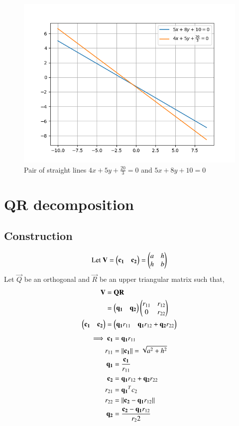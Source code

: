 \documentclass[journal,12pt,twocolumn]{IEEEtran}
\begin{document}
\begin{figure}[h]
	\centering
	\includegraphics[width=\columnwidth]{fig/figure_2.png}
	\caption{Pair of straight lines $4x + 5y + \frac{20}{3} = 0$ and $5x + 8y + 10 = 0$}
	\label{fig:figure2}
\end{figure}
\section{QR decomposition}
\subsection{Construction}

\begin{equation}\label{eq28}
	\text{Let } \mathbf{V} = \begin{pmatrix}\mathbf{c_1} & \mathbf{c_2}\end{pmatrix} = \begin{pmatrix}a & h\\h & b\end{pmatrix}
\end{equation}
Let $\vec{Q}$ be an orthogonal and $\vec{R}$ be an upper triangular matrix such that, 
\begin{align}\label{eq29}
	\mathbf{V} &= \mathbf{Q}\mathbf{R}\\
	&= \begin{pmatrix}\mathbf{q_1} & \mathbf{q_2}\end{pmatrix}\begin{pmatrix}r_{11} & r_{12}\\0 & r_{22}\end{pmatrix}\\
	\begin{pmatrix}\mathbf{c_1} & \mathbf{c_2}\end{pmatrix} &= \begin{pmatrix}\mathbf{q_1}r_{11} & \mathbf{q_1}r_{12} + \mathbf{q_2}r_{22}\end{pmatrix}
\end{align}
\begin{align}
	\label{eq32}\implies\mathbf{c_1} &= \mathbf{q_1}r_{11}\\
	\label{eq33}r_{11} &= \left\lVert\mathbf{c_1}\right\rVert = \sqrt{a^2 + h^2}\\
	\label{eq34}\mathbf{q_1} &= \frac{\mathbf{c_1}}{r_{11}}\\
	\label{eq35}\mathbf{c_2} &= \mathbf{q_1}r_{12} + \mathbf{q_2}r_{22}\\
	\label{eq36}r_{21} &= \mathbf{q_1}^Tc_2\\
	\label{eq37}r_{22} &= \left\lVert\mathbf{c_2} - \mathbf{q_{1}}r_{12}\right\rVert\\
	\label{eq38}\mathbf{q_2} &= \frac{\mathbf{c_2} - \mathbf{q_{1}}r_{12}}{r_22}
\end{align}
\end{document}
